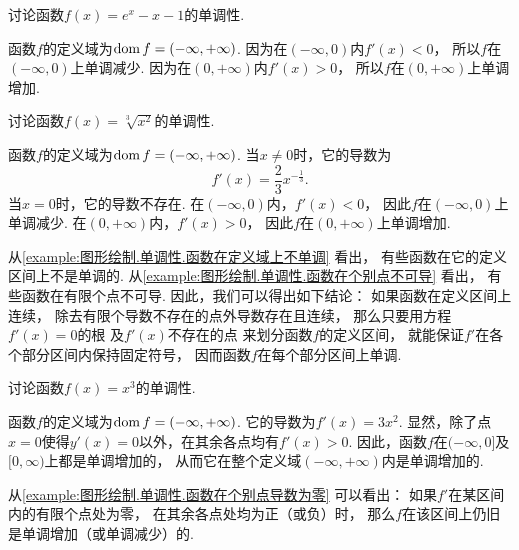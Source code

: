 \begin{example}\label{example:图形绘制.单调性.函数在定义域上不单调}
讨论函数\(f(x) = e^x - x - 1\)的单调性.
\begin{solution}
函数\(f\)的定义域为\(\operatorname{dom} f = (-\infty,+\infty)\).
因为在\((-\infty,0)\)内\(f'(x)<0\)，
所以\(f\)在\((-\infty,0)\)上单调减少.
因为在\((0,+\infty)\)内\(f'(x)>0\)，
所以\(f\)在\((0,+\infty)\)上单调增加.
\end{solution}
\end{example}
\begin{example}\label{example:图形绘制.单调性.函数在个别点不可导}
讨论函数\(f(x) = \sqrt[3]{x^2}\)的单调性.
\begin{solution}
函数\(f\)的定义域为\(\operatorname{dom} f = (-\infty,+\infty)\).
当\(x\neq0\)时，它的导数为\begin{equation*}
	f'(x) = \frac23 x^{-\frac13}.
\end{equation*}
当\(x=0\)时，它的导数不存在.
在\((-\infty,0)\)内，\(f'(x)<0\)，
因此\(f\)在\((-\infty,0)\)上单调减少.
在\((0,+\infty)\)内，\(f'(x)>0\)，
因此\(f\)在\((0,+\infty)\)上单调增加.
\end{solution}
\end{example}
\begin{remark}
从\cref{example:图形绘制.单调性.函数在定义域上不单调} 看出，
有些函数在它的定义区间上不是单调的.
从\cref{example:图形绘制.单调性.函数在个别点不可导} 看出，
有些函数在有限个点不可导.
因此，我们可以得出如下结论：
如果函数在定义区间上连续，
除去有限个导数不存在的点外导数存在且连续，
那么只要用方程\(f'(x) = 0\)的根
及\(f'(x)\)不存在的点
来划分函数\(f\)的定义区间，
就能保证\(f'\)在各个部分区间内保持固定符号，
因而函数\(f\)在每个部分区间上单调.
\end{remark}
\begin{example}\label{example:图形绘制.单调性.函数在个别点导数为零}
讨论函数\(f(x) = x^3\)的单调性.
\begin{solution}
函数\(f\)的定义域为\(\operatorname{dom} f = (-\infty,+\infty)\).
它的导数为\(f'(x) = 3x^2\).
显然，除了点\(x=0\)使得\(y'(x) = 0\)以外，在其余各点均有\(f'(x)>0\).
因此，函数\(f\)在\((-\infty,0]\)及\([0,\infty)\)上都是单调增加的，
从而它在整个定义域\((-\infty,+\infty)\)内是单调增加的.
\end{solution}
\end{example}
\begin{remark}
从\cref{example:图形绘制.单调性.函数在个别点导数为零} 可以看出：
如果\(f'\)在某区间内的有限个点处为零，
在其余各点处均为正（或负）时，
那么\(f\)在该区间上仍旧是单调增加（或单调减少）的.
\end{remark}

